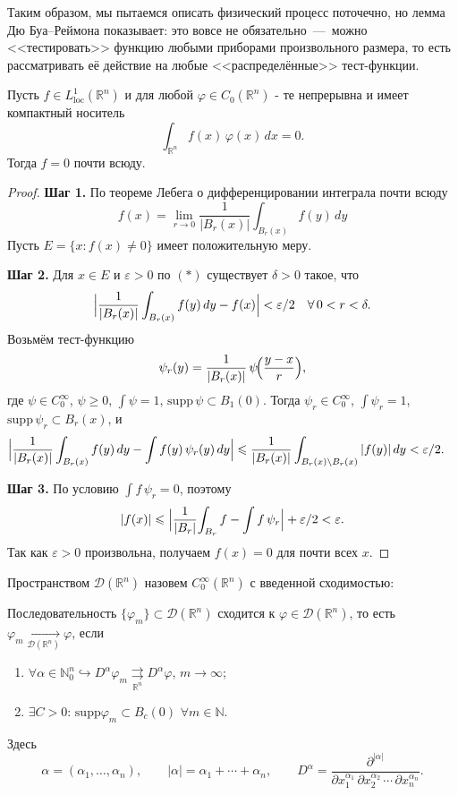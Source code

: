 Таким образом, мы пытаемся описать физический процесс поточечно, но лемма Дю Буа--Реймона показывает: это вовсе не обязательно~---~можно <<тестировать>> функцию любыми приборами произвольного размера, то есть рассматривать её действие на любые <<распределённые>> тест-функции.



\begin{lemma}
Пусть $f\in L^1_{\mathrm{loc}}(\mathbb R^n)$ и для любой $\varphi\in C_0(\mathbb R^n)$ - те непрерывна и имеет компактный носитель
\[
\int_{\mathbb R^n}f(x)\,\varphi(x)\,dx=0.
\]
Тогда $f=0$ почти всюду.
\end{lemma}

\begin{proof}
\textbf{Шаг 1.}
По теореме Лебега о дифференцировании интеграла почти всюду
\[
f(x)
=\lim_{r\to0}\frac1{|B_r(x)|}\int_{B_r(x)}f(y)\,dy
\tag{$*$}
\]
Пусть $E=\{x:f(x)\neq0\}$ имеет положительную меру.

\textbf{Шаг 2.}
Для $x\in E$ и $\varepsilon>0$ по $(*)$ существует $\delta>0$ такое, что
\[
\Bigl|\frac1{|B_r(x)|}\int_{B_r(x)}f(y)\,dy - f(x)\Bigr|<\varepsilon/2
\quad
\forall\,0<r<\delta.
\]
Возьмём тест-функцию
\[
\psi_r(y)
=\frac1{|B_r(x)|}\,\psi\!\Bigl(\frac{y-x}{r}\Bigr),
\]
где $\psi\in C_0^\infty$, $\psi\ge0$, $\int\psi=1$, $\mathrm{supp}\,\psi\subset B_1(0)$.
Тогда $\psi_r\in C_0^\infty$, $\int\psi_r=1$, $\mathrm{supp}\,\psi_r\subset B_r(x)$, и
\begin{align*}
\Bigl|\frac1{|B_r(x)|}\int_{B_r(x)}f(y)\,dy - \int f(y)\,\psi_r(y)\,dy\Bigr|
&\le
\frac1{|B_r(x)|}\int_{B_{r}(x)\setminus B_r(x)}|f(y)|\,dy
<\varepsilon/2.
\end{align*}

\textbf{Шаг 3.}
По условию $\int f\,\psi_r=0$, поэтому
\[
|f(x)| \le \Bigl|\frac1{|B_r|}\!\int_{B_r}f - \int f\,\psi_r\Bigr| + \varepsilon/2
<\varepsilon.
\]
Так как $\varepsilon>0$ произвольна, получаем $f(x)=0$ для почти всех $x$.
\end{proof}

\begin{definition}
Пространством $\mathcal{D}(\mathbb{R}^n)$ назовем $C_0^\infty(\mathbb{R}^n)$ с введенной сходимостью:

Последовательность $\{ \varphi_m\} \subset \mathcal{D}(\mathbb{R}^n)$ сходится к $\varphi \in \mathcal{D}(\mathbb{R}^n)$, то есть $\varphi_m \xrightarrow[\mathcal{D}(\mathbb{R}^n)]{} \varphi$, если
\begin{enumerate}
    \item $\forall \alpha \in \mathbb{N}^n_0 \hookrightarrow D^{\alpha} \varphi_m \mathrel{\mathop{\rightrightarrows}\limits_{\mathbb{R}^n}} D^{\alpha} \varphi$, $m \to \infty$;
    \item $\exists C > 0$: $\text{supp}\varphi_m \subset B_c(0)$ $\forall m \in \mathbb{N}$.
\end{enumerate}

Здесь
\[
\alpha = (\alpha_1, \ldots, \alpha_n), \qquad
|\alpha|=\alpha_1+\cdots+\alpha_n,
\qquad
D^\alpha
=\frac{\partial^{|\alpha|}}{\partial x_1^{\alpha_1}\,\partial x_2^{\alpha_2}\,\cdots\,\partial x_n^{\alpha_n}}.
\]
\end{definition}

